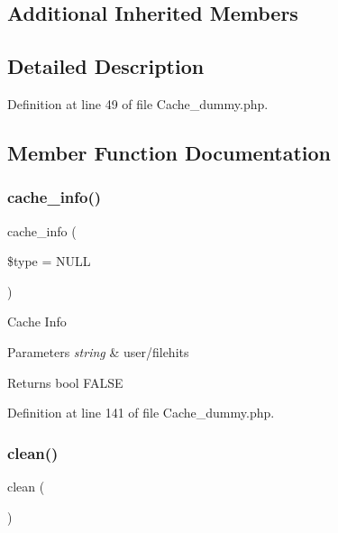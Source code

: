 \subsection*{Additional Inherited Members}


\subsection{Detailed Description}


Definition at line 49 of file Cache\+\_\+dummy.\+php.



\subsection{Member Function Documentation}
\mbox{\label{class_c_i___cache__dummy_aa8b9c4d9f0387156736ccd8850f0727e}} 
\subsubsection{\texorpdfstring{cache\_info()}{cache\_info()}}
{\footnotesize\ttfamily cache\+\_\+info (\begin{DoxyParamCaption}\item[{}]{\$type = {\ttfamily NULL} }\end{DoxyParamCaption})}

Cache Info


\begin{DoxyParams}{Parameters}
{\em string} & user/filehits \\
\hline
\end{DoxyParams}
\begin{DoxyReturn}{Returns}
bool F\+A\+L\+SE 
\end{DoxyReturn}


Definition at line 141 of file Cache\+\_\+dummy.\+php.

\mbox{\label{class_c_i___cache__dummy_adb40b812890a8bc058bf6b7a0e1a54d9}} 
\subsubsection{\texorpdfstring{clean()}{clean()}}
{\footnotesize\ttfamily clean (\begin{DoxyParamCaption}{ }\end{DoxyParamCaption})}

